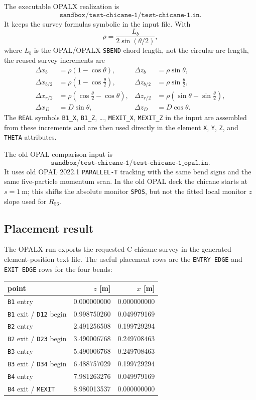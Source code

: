\documentclass[11pt]{article}
\newcommand{\code}[1]{\texttt{#1}}
\begin{document}
The executable OPALX realization is
\[
  \code{sandbox/test-chicane-1/test-chicane-1.in}.
\]
It keeps the survey formulas symbolic in the input file.  With
\[
  \rho=\frac{L_b}{2\sin(\theta/2)},
\]
where \(L_b\) is the OPAL/OPALX \code{SBEND} chord length, not the circular arc
length, the reused survey increments are
\[
\begin{aligned}
  \Delta x_b &= \rho(1-\cos\theta),
  &\Delta z_b &= \rho\sin\theta,\\
  \Delta x_{b/2} &= \rho\left(1-\cos\frac{\theta}{2}\right),
  &\Delta z_{b/2} &= \rho\sin\frac{\theta}{2},\\
  \Delta x_{r/2} &= \rho\left(\cos\frac{\theta}{2}-\cos\theta\right),
  &\Delta z_{r/2} &= \rho\left(\sin\theta-\sin\frac{\theta}{2}\right),\\
  \Delta x_D &= D\sin\theta,
  &\Delta z_D &= D\cos\theta .
\end{aligned}
\]
The \code{REAL} symbols \code{B1\_X}, \code{B1\_Z}, \ldots,
\code{MEXIT\_X}, \code{MEXIT\_Z} in the input are assembled from these
increments and are then used directly in the element \code{X}, \code{Y},
\code{Z}, and \code{THETA} attributes.

The old OPAL comparison input is
\[
  \code{sandbox/test-chicane-1/test-chicane-1\_opal.in}.
\]
It uses old OPAL 2022.1 \code{PARALLEL-T} tracking with the same bend signs and
the same five-particle momentum scan.  In the old OPAL deck the chicane starts
at \(s=1\ \mathrm{m}\); this shifts the absolute monitor \code{SPOS}, but not
the fitted local monitor \(z\) slope used for \(R_{56}\).

\subsection{Placement result}

The OPALX run exports the requested C-chicane survey in the generated
element-position text file.  The useful placement rows are the
\code{ENTRY EDGE} and \code{EXIT EDGE} rows for the four bends:

\begin{center}
\begin{tabular}{@{}lrr@{}}
\toprule
point & \(z\) [m] & \(x\) [m] \\
\midrule
\code{B1} entry & 0.000000000 & 0.000000000 \\
\code{B1} exit / \code{D12} begin & 0.998750260 & 0.049979169 \\
\code{B2} entry & 2.491256508 & 0.199729294 \\
\code{B2} exit / \code{D23} begin & 3.490006768 & 0.249708463 \\
\code{B3} entry & 5.490006768 & 0.249708463 \\
\code{B3} exit / \code{D34} begin & 6.488757029 & 0.199729294 \\
\code{B4} entry & 7.981263276 & 0.049979169 \\
\code{B4} exit / \code{MEXIT} & 8.980013537 & 0.000000000 \\
\bottomrule
\end{tabular}
\end{center}
\end{document}
